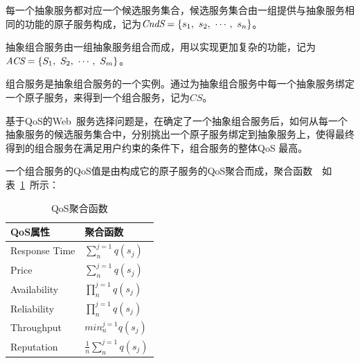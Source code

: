 \begin{definition}[候选服务集合]
    每一个抽象服务都对应一个候选服务集合，候选服务集合由一组提供与抽象服务相同的功能的原子服务构成，记为$\emph{CndS}=\{s_{1},\ s_{2},\ \cdots,\ s_{n}\}$。
\end{definition}

\begin{definition}[抽象组合服务]
    抽象组合服务由一组抽象服务组合而成，用以实现更加复杂的功能，记为$\emph{ACS}=\{S_{1},\ S_{2},\ \cdots,\ S_{m}\}$。
\end{definition}

\begin{definition}[组合服务]
    组合服务是抽象组合服务的一个实例。通过为抽象组合服务中每一个抽象服务绑定一个原子服务，来得到一个组合服务，记为$CS$。
\end{definition}

基于QoS的Web~服务选择问题是，在确定了一个抽象组合服务后，如何从每一个抽象服务的候选服务集合中，分别挑出一个原子服务绑定到抽象服务上，使得最终得到的组合服务在满足用户约束的条件下，组合服务的整体QoS 最高。

一个组合服务的QoS值是由构成它的原子服务的QoS聚合而成，聚合函数~\cite{alrifai2012hybrid}~如表~\ref{T:Tab_QoSAgg}~所示：




\begin{table}[!thp]
\centering  %
\renewcommand{\arraystretch}{1.1} %
\begin{tabular}{|p{5cm}<{\centering}|p{5cm}<{\centering}|}  %
\hline
QoS属性 & 聚合函数 \\\hline\hline
Response Time & $\sum^{j=1}_{n}q(s_{j})$ \\\hline
Price & $\sum^{j=1}_{n}q(s_{j})$ \\\hline
Availability & $\prod^{j=1}_{n}q(s_{j})$ \\\hline
Reliability & $\prod^{j=1}_{n}q(s_{j})$ \\\hline
Throughput & $min^{j=1}_{n}q(s_{j})$\\\hline
Reputation & $\frac{1}{n}\sum^{j=1}_{n}q(s_{j})$ \\\hline
\end{tabular}
\caption{QoS聚合函数}\label{T:Tab_QoSAgg}
\end{table}

